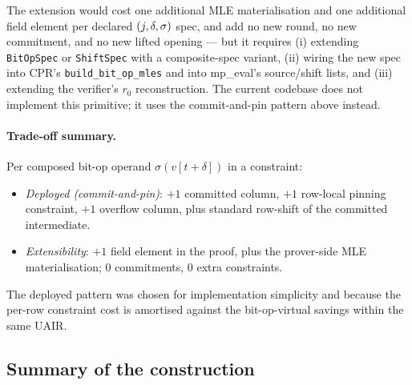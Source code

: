 The extension would cost one additional MLE materialisation and one
additional field element per declared $(j,\delta,\sigma)$ spec, and
add no new round, no new commitment, and no new lifted opening — but
it requires (i) extending \texttt{BitOpSpec} or \texttt{ShiftSpec}
with a composite-spec variant, (ii) wiring the new spec into CPR's
\texttt{build\_bit\_op\_mles} and into mp\_eval's source/shift lists,
and (iii) extending the verifier's $r_0$ reconstruction. The current
codebase does not implement this primitive; it uses the commit-and-pin
pattern above instead.

\paragraph{Trade-off summary.} Per composed bit-op operand
$\sigma(v[t+\delta])$ in a constraint:
\begin{itemize}[leftmargin=2em]
  \item \emph{Deployed (commit-and-pin)}: $+1$ committed column,
    $+1$ row-local pinning constraint, $+1$ overflow column, plus
    standard row-shift of the committed intermediate.
  \item \emph{Extensibility}: $+1$ field element in the proof, plus
    the prover-side MLE materialisation; $0$ commitments, $0$ extra
    constraints.
\end{itemize}
The deployed pattern was chosen for implementation simplicity and
because the per-row constraint cost is amortised against the
bit-op-virtual savings within the same UAIR.

\subsection{Summary of the construction}

